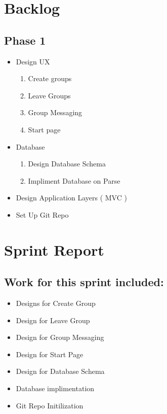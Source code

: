 \documentclass[11pt]{article}
\begin{document}
\section*{Backlog}

\subsection*{Phase 1}

	
	\begin{itemize}
	\item Design UX
		\begin{enumerate}
		\item Create groups
		\item Leave Groups
		\item Group Messaging
		\item Start page
		\end{enumerate}
	\item Database
		\begin{enumerate}
		\item Design Database Schema
		\item Impliment Database on Parse
		\end{enumerate}
	\item Design Application Layers ( MVC )
	\item Set Up Git Repo
	\end{itemize}
	
\section*{Sprint Report}

\subsection*{Work for this sprint included:}
	\begin{itemize}
	\item Designs for Create Group
	\item Design for Leave Group
	\item Design for Group Messaging
	\item Design for Start Page
	\item Design for Database Schema
	\item Database implimentation
	\item Git Repo Initilization 
	\end{itemize}
\end{document}
